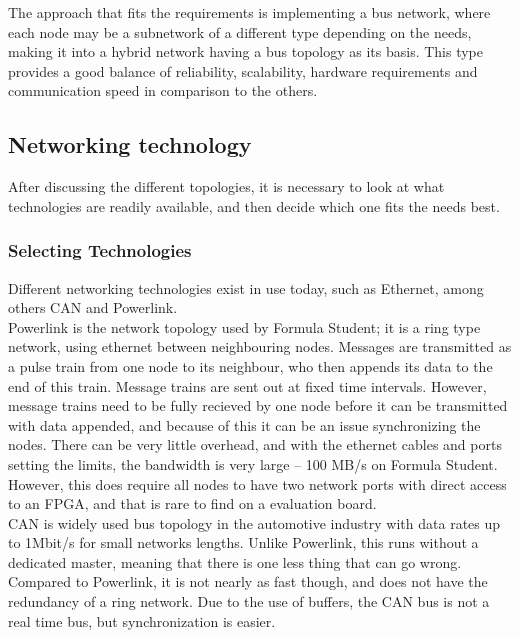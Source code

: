 The approach that fits the requirements is implementing a bus network, where each node may be a subnetwork of a different type depending on the needs, making it into a hybrid network having a bus topology as its basis.
This type provides a good balance of reliability, scalability, hardware requirements and communication speed in comparison to the others.
\subsection{Networking technology}
After discussing the different topologies, it is necessary to look at what technologies are readily available, and then decide which one fits the needs best.
\subsubsection{Selecting Technologies}
Different networking technologies exist in use today, such as Ethernet, among others CAN and Powerlink.\\
Powerlink is the network topology used by Formula Student; it is a ring type network, using ethernet between neighbouring nodes.
Messages are transmitted as a pulse train from one node to its neighbour, who then appends its data to the end of this train. 
Message trains are sent out at fixed time intervals.
However, message trains need to be fully recieved by one node before it can be transmitted with data appended, and because of this it can be an issue synchronizing the nodes.
There can be very little overhead, and with the ethernet cables and ports setting the limits, the bandwidth is very large -- 100 MB/s on Formula Student.
However, this does require all nodes to have two network ports with direct access to an FPGA, and that is rare to find on a evaluation board.\\

CAN is widely used bus topology in the automotive industry with data rates up to 1Mbit/s for small networks lengths.
Unlike Powerlink, this runs without a dedicated master, meaning that there is one less thing that can go wrong.
Compared to Powerlink, it is not nearly as fast though, and does not have the redundancy of a ring network.
Due to the use of buffers, the CAN bus is not a real time bus, but synchronization is easier.\\

